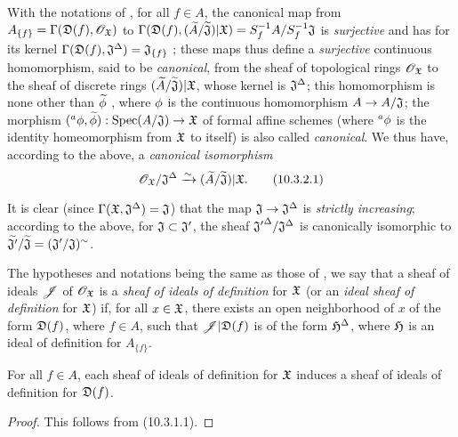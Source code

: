 \begin{env}[10.3.2]
\label{1.10.3.2}
With the notations of , for all $f\in A$, the canonical map from $A_{\{f\}}=\Gamma(\mathfrak{D}(f),\mathscr{O}_\mathfrak{X})$ to $\Gamma(\mathfrak{D}(f),(\widetilde{A}/\widetilde{\mathfrak{J}})|\mathfrak{X})=S_f^{-1}A/S_f^{-1}\mathfrak{J}$ is \emph{surjective} and has for its kernel $\Gamma(\mathfrak{D}(f),\mathfrak{J}^\Delta)=\mathfrak{J}_{\{f\}}$ ; these maps thus define a \emph{surjective} continuous homomorphism, said to be \emph{canonical}, from the sheaf of topological rings $\mathscr{O}_\mathfrak{X}$ to the sheaf of discrete rings $(\widetilde{A}/\widetilde{\mathfrak{J}})|\mathfrak{X}$, whose kernel is $\mathfrak{J}^\Delta$; this homomorphism is none other than $\widetilde{\phi}$ , where $\phi$ is the continuous homomorphism $A\to A/\fk{J}$; the morphism $({}^a\vphi,\wt{\vphi}):\Spec(A/\fk{J})\to\fk{X}$ of formal affine schemes (where ${}^a\phi$ is the identity homeomorphism from $\mathfrak{X}$ to itself) is also called \emph{canonical}.
We thus have, according to the above, a \emph{canonical isomorphism}
\[
  \mathscr{O}_\mathfrak{X}/\mathfrak{J}^\Delta\xrightarrow{\sim}(\widetilde{A}/\widetilde{\mathfrak{J}})|\mathfrak{X}.
  \tag{10.3.2.1}
\]

It is clear (since $\Gamma(\mathfrak{X},\mathfrak{J}^\Delta)=\mathfrak{J}$) that the map $\fk{J}\to\fk{J}^\Delta$ is \emph{strictly increasing}; according to the above, for $\mathfrak{J}\subset\mathfrak{J}'$, the sheaf ${\mathfrak{J}'}^\Delta/\mathfrak{J}^\Delta$ is canonically isomorphic to $\widetilde{\mathfrak{J}'}/\widetilde{\mathfrak{J}}=(\mathfrak{J}'/\mathfrak{J})^\sim$.
\end{env}

\begin{env}[10.3.3]
\label{1.10.3.3}
The hypotheses and notations being the same as those of , we say that a sheaf of ideals $\mathscr{J}$ of $\mathscr{O}_\mathfrak{X}$ is a \emph{sheaf of ideals of definition} for $\mathfrak{X}$ (or an \emph{ideal sheaf of definition} for $\mathfrak{X}$) if, for all $x\in\mathfrak{X}$, there exists an open neighborhood of $x$ of the form $\mathfrak{D}(f)$, where $f\in A$, such that $\mathscr{J}|\mathfrak{D}(f)$ is of the form $\mathfrak{H}^\Delta$, where $\mathfrak{H}$ is an ideal of definition for $A_{\{f\}}$.
\end{env}

\begin{prop}[10.3.4]
\label{1.10.3.4}
For all $f\in A$, each sheaf of ideals of definition for $\mathfrak{X}$ induces a sheaf of ideals of definition for $\mathfrak{D}(f)$.
\end{prop}

\begin{proof}
\label{proof-1.10.3.4}
This follows from (10.3.1.1).
\end{proof}

